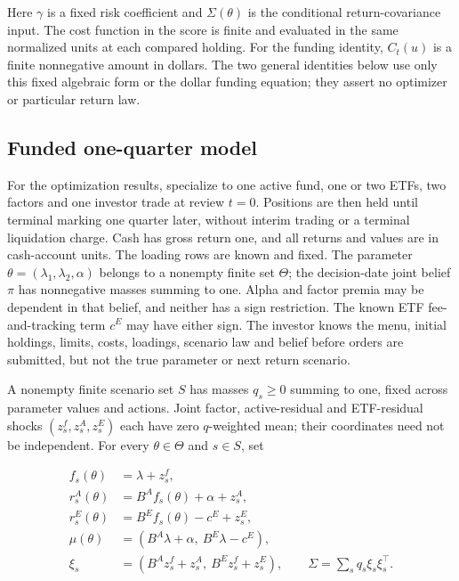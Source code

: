 \documentclass[11pt]{article}
\begin{document}
Here \(\gamma\) is a fixed risk coefficient and \(\Sigma(\theta)\)
is the conditional return-covariance input. The cost function in the score is finite
and evaluated in the same normalized units at each compared holding.
For the funding identity, \(C_t(u)\) is a finite nonnegative amount
in dollars. The two general
identities below use only this fixed algebraic form or the dollar
funding equation; they assert no optimizer or particular return law.

\subsection*{Funded one-quarter model}

For the optimization results, specialize to one active fund, one
or two ETFs, two factors and one investor trade at review \(t=0\).
Positions are then held until terminal marking one quarter later,
without interim trading or a terminal liquidation charge. Cash has
gross return one, and all returns and values are in cash-account
units. The loading rows are known and fixed. The parameter
\(\theta=(\lambda_1,\lambda_2,\alpha)\) belongs to a nonempty finite
set \(\Theta\); the decision-date joint belief \(\pi\) has
nonnegative masses summing to one. Alpha and factor premia may be
dependent in that belief, and neither has a sign restriction.
The known ETF fee-and-tracking term \(c^E\) may have either sign.
The investor knows the menu, initial holdings, limits, costs,
loadings, scenario law and belief before orders are submitted, but
not the true parameter or next return scenario.

A nonempty finite scenario set \(S\) has masses \(q_s\geq0\) summing
to one, fixed across parameter values and actions. Joint factor,
active-residual and ETF-residual shocks
\((z^f_s,z^A_s,z^E_s)\) each have zero \(q\)-weighted mean; their
coordinates need not be independent. For every \(\theta\in\Theta\)
and \(s\in S\), set

\begin{equation*}
\begin{aligned}
f_s(\theta)&=\lambda+z^f_s,\\
r^A_s(\theta)&=B^A f_s(\theta)+\alpha+z^A_s,\\
r^E_s(\theta)&=B^E f_s(\theta)-c^E+z^E_s,\\
\mu(\theta)&=(B^A\lambda+\alpha,\ B^E\lambda-c^E),\\
\xi_s&=(B^A z^f_s+z^A_s,\ B^E z^f_s+z^E_s),
\qquad \Sigma=\sum_s q_s\xi_s\xi_s^\top .
\end{aligned}
\end{equation*}
\end{document}
